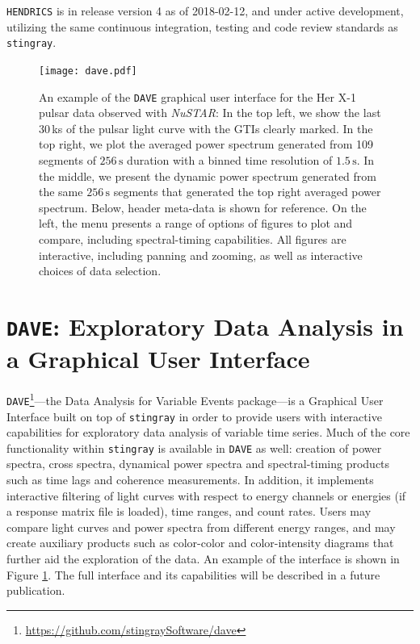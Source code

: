 \documentclass[twocolumn]{aastex62}
\newcommand{\project}[1]{\textsl{#1}\xspace}
\newcommand{\nustar}{\project{NuSTAR}\xspace}
\newcommand{\stingray}{\texttt{stingray}\xspace}
\newcommand{\hendrics}{\texttt{HENDRICS}\xspace}
\newcommand{\dave}{\texttt{DAVE}\xspace}
\begin{document}
\hendrics is in release version 4 as of 2018-02-12, and under active development, utilizing the same continuous integration, testing and code review standards as \stingray.


\begin{figure}[htbp]
\begin{center}
\texttt{[image: dave.pdf]}
\caption{An example of the \dave graphical user interface for the Her X-1 pulsar data observed with \nustar: 
In the top left, we show the last 30\,ks of the pulsar light curve with the GTIs clearly marked. In the top right, we plot the averaged power spectrum generated from 109 segments of $256\,\mathrm{s}$ duration with a binned time resolution of $1.5\,\mathrm{s}$. 
In the middle, we present the dynamic power spectrum generated from the same $256\,\mathrm{s}$ segments that generated the top right averaged power spectrum. 
Below, header meta-data is shown for reference. 
On the left, the menu presents a range of options of figures to plot and compare, including spectral-timing capabilities. 
All figures are interactive, including panning and zooming, as well as interactive choices of data selection.}
\label{fig:dave}
\end{center}
\end{figure}

\section{\texttt{DAVE}: Exploratory Data Analysis in a Graphical User Interface}
\label{sec:dave}

\dave\footnote{\url{https://github.com/stingraySoftware/dave}}---the Data Analysis for Variable Events package---is a Graphical User Interface built on top of \stingray in order to provide users with interactive capabilities for exploratory data analysis of variable time series. 
Much of the core functionality within \stingray is available in \dave as well: creation of power spectra, cross spectra, dynamical power spectra and spectral-timing products such as time lags and coherence measurements. 
In addition, it implements interactive filtering of light curves with respect to energy channels or energies (if a response matrix file is loaded), time ranges, and count rates. 
Users may compare light curves and power spectra from different energy ranges, and may create auxiliary products such as color-color and color-intensity diagrams that further aid the exploration of the data. 
An example of the interface is shown in Figure \ref{fig:dave}. 
The full interface and its capabilities will be described in a future publication. 
\end{document}
